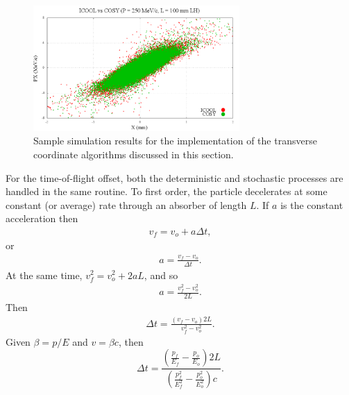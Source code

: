 \begin{figure}[H]
  \centering
    \includegraphics[width=0.7\textwidth]{Figures/xpx_phase_space_implemented} 
  \caption{Sample simulation results for the implementation of the transverse coordinate algorithms discussed in this section.}
  \label{fig:xpx_phase_space_implemented}
\end{figure}
%
%
\label{sec:COSYTemporalDisplacement}\par
For the time-of-flight offset, both the deterministic and stochastic processes are handled in the same routine. To first order, the particle decelerates at some constant (or average) rate through an absorber of length $L$. If $a$ is the constant acceleration then 
\begin{align*}
v_f=v_o+a\Delta t,
\end{align*}
or 
\begin{align*}
a=\frac{v_f-v_o}{\Delta t}.
\end{align*}
At the same time, $v_f ^2 = v_o ^2 + 2 a L$, and so
\begin{align*}
 a=\frac{v_f ^2 - v_o ^2}{2L}.
\end{align*}
Then
\begin{align*}
\Delta t = \frac{(v_f-v_o)2L}{v_f^2-v_o^2}.
\end{align*}
Given $\beta=p/E$ and $v=\beta c$, then
\begin{equation}\label{eqn:cosyDeltaT}
\Delta t=\frac{(\frac{p_f}{E_f}-\frac{p_o}{E_o})2L}{(\frac{p_f ^2}{E_f ^2}-\frac{p_o ^2}{E_o ^2})c}.
\end{equation}

